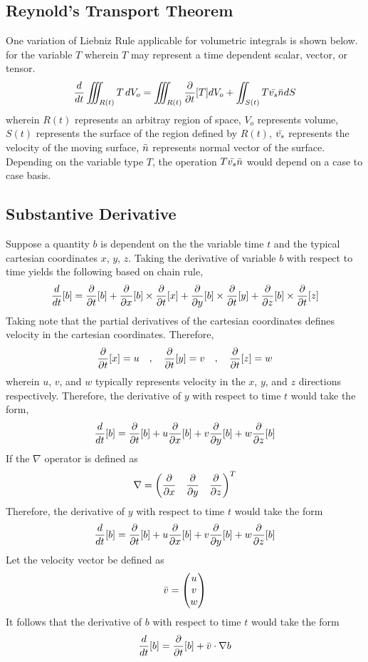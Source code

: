 \documentclass[class=report, 12pt, crop=false]{standalone}
\begin{document}
\begin{center}
\chapter{Reynold's Transport Theorem}
\begin{comment}
Liebnitz Theorem
\end{comment}
One variation of Liebniz Rule applicable for volumetric integrals is shown below. for the variable $T$ wherein $T$ may represent a time dependent scalar, vector, or tensor.
$$\frac{d}{dt}\iiint_{R(t)}T\,dV_o = \iiint_{R(t)}\frac{\partial}{\partial t}[T]dV_o + \iint_{S(t)}T\bar{v_s}\bar{n}dS$$
wherein $R(t)$ represents an arbitray region of space, $V_o$ represents volume, $S(t)$ represents the surface of the region defined by $R(t)$, $\bar{v_s}$ represents the velocity of the moving surface, $\bar{n}$ represents normal vector of the surface. Depending on the variable type $T$, the operation $\displaystyle{T\bar{v_s}\bar{n}}$ would depend on a case to case basis.
\section{Substantive Derivative}
\begin{comment}
Substantive Derivative
Needs Serious revamping
\end{comment}
Suppose a quantity $b$ is dependent on the the variable time $t$ and the typical cartesian coordinates $x$, $y$, $z$. Taking the derivative of variable $b$ with respect to time yields the following based on chain rule,
$$\frac{d}{dt}[b] = \frac{\partial}{\partial t}[b] + \frac{\partial}{\partial x}[b]\times\frac{\partial}{\partial t}[x] + \frac{\partial}{\partial y}[b]\times\frac{\partial}{\partial t}[y] + \frac{\partial}{\partial z}[b]\times\frac{\partial}{\partial t}[z]$$
Taking note that the partial derivatives of the cartesian coordinates defines velocity in the cartesian coordinates. Therefore, 
$$\frac{\partial}{\partial t}[x] = u\quad,\quad \frac{\partial}{\partial t}[y] = v\quad,\quad \frac{\partial}{\partial t}[z] = w$$
wherein $u$, $v$, and $w$ typically represents velocity in the $x$, $y$, and $z$ directions respectively. Therefore, the derivative of $y$ with respect to time $t$ would take the form,
$$\frac{d}{dt}[b] = \frac{\partial}{\partial t}[b] + u\frac{\partial}{\partial x}[b] + v\frac{\partial}{\partial y}[b] + w\frac{\partial}{\partial z}[b]$$
If the $\nabla$ operator is defined as
$$\nabla = \begin{pmatrix} \displaystyle{\frac{\partial}{\partial x}}& \displaystyle{\frac{\partial}{\partial y}}& \displaystyle{\frac{\partial}{\partial z}} \end{pmatrix}^T$$
Therefore, the derivative of $y$ with respect to time $t$ would take the form
$$\frac{d}{dt}[b] = \frac{\partial}{\partial t}[b] + u\frac{\partial}{\partial x}[b] + v\frac{\partial}{\partial y}[b] + w\frac{\partial}{\partial z}[b]$$
Let the velocity vector be defined as 
$$\bar{v} = \begin{pmatrix}u\\v\\w\\ \end{pmatrix}$$
It follows that the derivative of $b$ with respect to time $t$ would take the form
$$\frac{d}{dt}[b] = \frac{\partial}{\partial t}[b] + \bar{v}\cdot\nabla b$$

\end{center}
\end{document}

